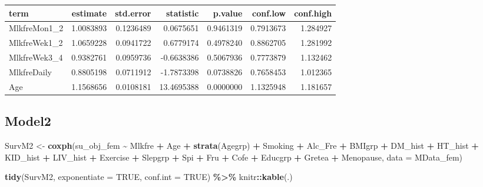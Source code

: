 \documentclass[
]{article}
\newenvironment{Shaded}{\begin{snugshade}}{\end{snugshade}}
\newcommand{\DataTypeTok}[1]{\textcolor[rgb]{0.13,0.29,0.53}{#1}}
\newcommand{\KeywordTok}[1]{\textcolor[rgb]{0.13,0.29,0.53}{\textbf{#1}}}
\newcommand{\NormalTok}[1]{#1}
\newcommand{\OperatorTok}[1]{\textcolor[rgb]{0.81,0.36,0.00}{\textbf{#1}}}
\newcommand{\OtherTok}[1]{\textcolor[rgb]{0.56,0.35,0.01}{#1}}
\newcommand{\StringTok}[1]{\textcolor[rgb]{0.31,0.60,0.02}{#1}}
\begin{document}
\begin{longtable}[]{@{}lrrrrrr@{}}
\toprule
term & estimate & std.error & statistic & p.value & conf.low &
conf.high\tabularnewline
\midrule
\endhead
MlkfreMon1\_2 & 1.0083893 & 0.1236489 & 0.0675651 & 0.9461319 &
0.7913673 & 1.284927\tabularnewline
MlkfreWek1\_2 & 1.0659228 & 0.0941722 & 0.6779174 & 0.4978240 &
0.8862705 & 1.281992\tabularnewline
MlkfreWek3\_4 & 0.9382761 & 0.0959736 & -0.6638386 & 0.5067936 &
0.7773879 & 1.132462\tabularnewline
MlkfreDaily & 0.8805198 & 0.0711912 & -1.7873398 & 0.0738826 & 0.7658453
& 1.012365\tabularnewline
Age & 1.1568656 & 0.0108181 & 13.4695388 & 0.0000000 & 1.1325948 &
1.181657\tabularnewline
\bottomrule
\end{longtable}

\hypertarget{model2-2}{%
\subsection{Model2}\label{model2-2}}

\begin{Shaded}
\begin{Highlighting}[]
\NormalTok{SurvM2 \textless{}{-}}\StringTok{  }\KeywordTok{coxph}\NormalTok{(su\_obj\_fem }\OperatorTok{\textasciitilde{}}\StringTok{ }\NormalTok{Mlkfre }\OperatorTok{+}\StringTok{ }\NormalTok{Age }\OperatorTok{+}\StringTok{ }\KeywordTok{strata}\NormalTok{(Agegrp) }\OperatorTok{+}\StringTok{ }\NormalTok{Smoking }\OperatorTok{+}\StringTok{ }\NormalTok{Alc\_Fre }\OperatorTok{+}\StringTok{ }
\StringTok{                   }\NormalTok{BMIgrp }\OperatorTok{+}\StringTok{ }\NormalTok{DM\_hist }\OperatorTok{+}\StringTok{ }\NormalTok{HT\_hist }\OperatorTok{+}\StringTok{ }\NormalTok{KID\_hist }\OperatorTok{+}\StringTok{ }\NormalTok{LIV\_hist }\OperatorTok{+}\StringTok{ }\NormalTok{Exercise }\OperatorTok{+}\StringTok{ }
\StringTok{                   }\NormalTok{Slepgrp }\OperatorTok{+}\StringTok{ }\NormalTok{Spi }\OperatorTok{+}\StringTok{ }\NormalTok{Fru }\OperatorTok{+}\StringTok{ }\NormalTok{Cofe }\OperatorTok{+}\StringTok{ }\NormalTok{Educgrp }\OperatorTok{+}\StringTok{ }\NormalTok{Gretea }\OperatorTok{+}\StringTok{ }\NormalTok{Menopause, }
                 \DataTypeTok{data =}\NormalTok{ MData\_fem)}

\KeywordTok{tidy}\NormalTok{(SurvM2, }\DataTypeTok{exponentiate =} \OtherTok{TRUE}\NormalTok{, }\DataTypeTok{conf.int =} \OtherTok{TRUE}\NormalTok{) }\OperatorTok{\%\textgreater{}\%}\StringTok{ }
\StringTok{  }\NormalTok{knitr}\OperatorTok{::}\KeywordTok{kable}\NormalTok{(.)}
\end{Highlighting}
\end{Shaded}
\end{document}
